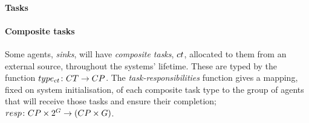\paragraph{Tasks}
\label{section:task_and_resources:tasks}

\newcommand{\formalTaskResponsibilities}[2]{
	\functionFormal{resp}
	{\setCompositeTaskType{}{} \times \powerSetAgent{}{}{}{}}
	({\setCompositeTaskType{}{} \times \setAgent{}{}})
}
\newcommand{\functionTaskResponsibilities}[2]{
	\functionSignature{resp}
	{\varCompositeTaskType{}{}, \setAgent{}{}}
}

\newcommand{\formalCompositeTaskType}[2]{
	\functionFormal{type_{\varCompositeTask{}{}}}
	{\setCompositeTask{}{}}
	{\setCompositeTaskType{}{}}
}

\paragraph{Composite tasks}
\label{section:problem:composite_tasks}

Some agents, \textit{sinks}, will have \textit{composite tasks}, $\varCompositeTask{}{}$, allocated to them from an external source, throughout the systems' lifetime. These are typed by the function $\formalCompositeTaskType{}{}$. The \textit{task-responsibilities} function gives a mapping, fixed on system initialisation, of each composite task type  to the group of agents that will receive those tasks and ensure their completion; $\formalTaskResponsibilities{}{}$.

\newcommand{\formalTaskDemandPoint}[2]{
	\functionFormal{demand}
	{\setAtomicTask  {}{}}{\tupleLocation{}{}}
}
\newcommand{\functionTaskDemandPoint}[2]{\functionSignature{demand}{\varAtomicTask{}{}}}

\newcommand{\functionRequiredResourcesSymbol}[2]{
	\functionSymbol{demandres}
}
\newcommand{\formalRequiredResources}[2]{
	\functionFormal{\functionRequiredResourcesSymbol{}{}}
	{\setAtomicTaskType{}{} \times \setResource{}{}}
	{\setRealNumbersNonNegative{}{}}
}
\newcommand{\functionRequiredResources}[2]{
	\functionSignature{\functionRequiredResourcesSymbol{}{}}{\varAtomicTaskType{}{}, \varResource{}{}}
}
\newcommand{\functionRequiredResourcesInstance}[2]{
	\functionSignature{\functionRequiredResourcesSymbol{}{}}
	{\functionAtomicTaskMapping{\varAtomicTask{}{}}{}, \varResource{}{}}
}

\newcommand{\formalAtomicTaskType}[2]{
	\functionFormal{type_{\varAtomicTask{}{}}}
	{\setAtomicTask{}{}}
	{\setAtomicTaskType{}{}}
}

